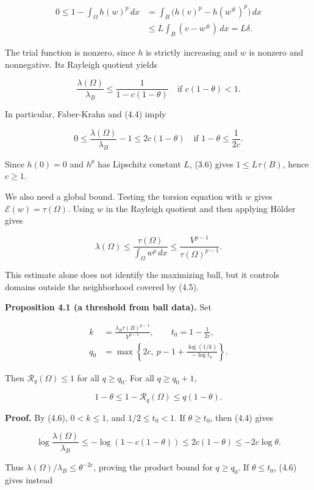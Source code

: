 \documentclass[11pt]{article}
\begin{document}
\[\begin{aligned}
0\leq1-\int_\Omega h(w)^p\,dx
&=\int_B\bigl(h(v)^p-h(w^\#)^p\bigr)\,dx\\
&\leq L\int_B(v-w^\#)\,dx=L\delta.
\end{aligned}\tag{4.3}\]

The trial function is nonzero, since \(h\) is strictly increasing and
\(w\) is nonzero and nonnegative. Its Rayleigh quotient yields

\[\frac{\lambda(\Omega)}{\lambda_B}
\leq\frac1{1-c(1-\theta)}
\quad\text{if }c(1-\theta)<1.\tag{4.4}\]

In particular, Faber-Krahn and (4.4) imply

\[0\leq\frac{\lambda(\Omega)}{\lambda_B}-1
\leq2c(1-\theta)
\quad\text{if }1-\theta\leq\frac1{2c}.\tag{4.5}\]

Since \(h(0)=0\) and \(h^p\) has Lipschitz constant \(L\), (3.6) gives
\(1\leq L\tau(B)\), hence \(c\geq1\).

We also need a global bound. Testing the torsion equation with \(w\)
gives \(\mathcal E(w)=\tau(\Omega)\). Using \(w\) in the Rayleigh
quotient and then applying Hölder gives

\[\lambda(\Omega)\leq\frac{\tau(\Omega)}{\int_\Omega w^p\,dx}
\leq\frac{V^{p-1}}{\tau(\Omega)^{p-1}}.\tag{4.6}\]

This estimate alone does not identify the maximizing ball, but it
controls domains outside the neighborhood covered by (4.5).

\textbf{Proposition 4.1 (a threshold from ball data).} Set

\[\begin{aligned}
k&=\frac{\lambda_B\tau(B)^{p-1}}{V^{p-1}},\qquad t_0=1-\frac1{2c},\\
q_0&=\max\left\{2c,\ p-1+\frac{\log(1/k)}{-\log t_0}\right\}.
\end{aligned}\tag{4.7}\]

Then \(\mathcal R_q(\Omega)\leq1\) for all \(q\geq q_0\). For all
\(q\geq q_0+1\),

\[1-\theta\leq1-\mathcal R_q(\Omega)\leq q(1-\theta).\tag{4.8}\]

\textbf{Proof.} By (4.6), \(0<k\leq1\), and \(1/2\leq t_0<1\). If
\(\theta\geq t_0\), then (4.4) gives

\[\log\frac{\lambda(\Omega)}{\lambda_B}
\leq-\log(1-c(1-\theta))
\leq2c(1-\theta)\leq-2c\log\theta.\]

Thus \(\lambda(\Omega)/\lambda_B\leq\theta^{-2c}\), proving the product
bound for \(q\geq q_0\). If \(\theta\leq t_0\), (4.6) gives instead
\end{document}
